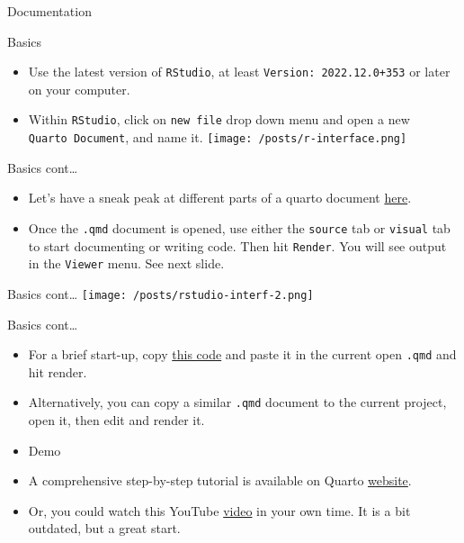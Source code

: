 \documentclass[
  ignorenonframetext,
  aspectratio=169,
]{beamer}
\providecommand{\tightlist}{%
  \setlength{\itemsep}{0pt}\setlength{\parskip}{0pt}}\usepackage{longtable,booktabs,array}
\begin{document}
\begin{frame}[fragile]{Documentation}
\label{documentation}
\begin{block}{Basics}
\label{basics}
\begin{itemize}[<+->]
\tightlist
\item
  Use the latest version of \texttt{RStudio}, at least
  \texttt{Version:\ 2022.12.0+353} or later on your computer.
\item
  Within \texttt{RStudio}, click on \texttt{new\ file} drop down menu
  and open a new \texttt{Quarto\ Document}, and name it.
  \texttt{[image: /posts/r-interface.png]}
\end{itemize}
\end{block}

\begin{block}{Basics cont\ldots{}}
\label{basics-cont}
\begin{itemize}
\tightlist
\item
  Let's have a sneak peak at different parts of a quarto document
  \href{https://monashdatafluency.github.io/r-rep-res-quarto/03-quarto-documents/index.html}{here}.
\item
  Once the \texttt{.qmd} document is opened, use either the
  \texttt{source} tab or \texttt{visual} tab to start documenting or
  writing code. Then hit \texttt{Render}. You will see output in the
  \texttt{Viewer} menu. See next slide.
\end{itemize}
\end{block}

\begin{block}{Basics cont\ldots{}}
\label{basics-cont-1}
\texttt{[image: /posts/rstudio-interf-2.png]}
\end{block}

\begin{block}{Basics cont\ldots{}}
\label{basics-cont-2}
\begin{itemize}[<+->]
\tightlist
\item
  For a brief start-up, copy
  \href{https://github.com/usman-afzali/quarto-with-rstudio/blob/main/posts/quartoBasics.qmd}{this
  code} and paste it in the current open \texttt{.qmd} and hit render.
\item
  Alternatively, you can copy a similar \texttt{.qmd} document to the
  current project, open it, then edit and render it.
\item
  Demo
\item
  A comprehensive step-by-step tutorial is available on Quarto
  \href{https://quarto.org/docs/authoring/markdown-basics.html}{website}.
\item
  Or, you could watch this YouTube
  \href{https://www.youtube.com/watch?v=yvi5uXQMvu4}{video} in your own
  time. It is a bit outdated, but a great start.
\end{itemize}
\end{block}


\end{frame}
\end{document}
